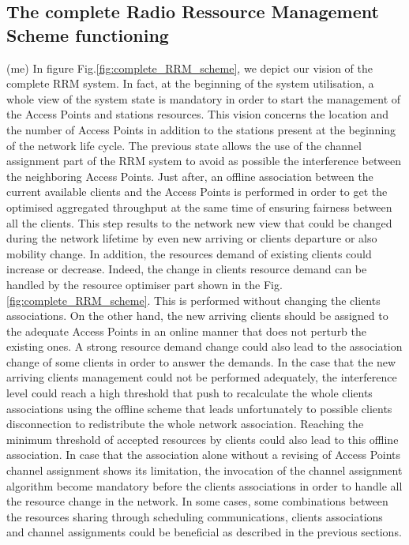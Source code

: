 \documentclass[journal,transmag]{IEEEtran}
\begin{document}
\subsection{The complete Radio Ressource Management Scheme functioning} (me)
In figure Fig.\ref{fig:complete_RRM_scheme}, we depict our vision of the complete RRM system.
In fact, at the beginning of the system utilisation, a whole view of the system state is mandatory in order to start the management of the Access Points and stations resources. This vision concerns the location and the number of Access Points in addition to the stations present at the beginning of the network life cycle. The previous state allows the use of the channel assignment part of the RRM system to avoid as possible the interference between the neighboring Access Points. Just after, an offline association between the current available clients and the Access Points is performed in order to get the optimised aggregated throughput at the same time of ensuring fairness between all the clients. This step results to the network new view that could be changed during the network lifetime by even new arriving or clients departure or also mobility change. In addition, the resources demand of existing clients could increase or decrease. Indeed, the change in clients resource demand can be handled by the resource optimiser part shown in the Fig.\ref{fig:complete_RRM_scheme}. This is performed without changing the clients associations. On the other hand, the new arriving clients should be assigned to the adequate Access Points in an online manner that does not perturb the existing ones. A strong resource demand change could also lead to the association change of some clients in order to answer the demands. In the case that the new arriving clients management could not be performed adequately, the interference level could reach a high threshold that push to recalculate the whole clients associations using the offline scheme that leads unfortunately to possible clients disconnection to redistribute the whole network association. Reaching the minimum threshold of accepted resources by clients could also lead to this offline association. In case that the association alone without a revising of Access Points channel assignment shows its limitation, the invocation of the channel assignment algorithm become mandatory before the clients associations in order to handle all the resource change in the network. In some cases, some combinations between the resources sharing through scheduling communications, clients associations and channel assignments could be beneficial as described in the previous sections.    
\end{document}

